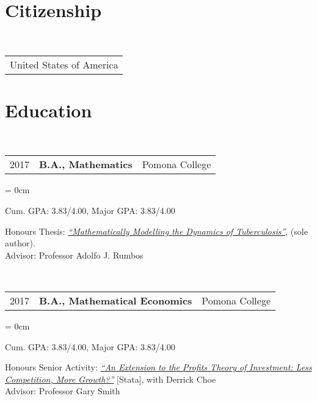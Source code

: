 \documentclass[a4paper, 11pt]{article}
\begin{document}
    \maketitle
    \thispagestyle{firststyle}

    \section{Citizenship}
      ~\begin{tabular}{l}
        United States of America\\
      \end{tabular}

    \section{Education}
      ~\begin{tabular}{lll}
        2017 & \textbf{B.A., Mathematics} & Pomona College\\
      \end{tabular}

    \begin{compactitem}\parskip = 0cm
      \item Cum. GPA: 3.83/4.00, Major GPA: 3.83/4.00\\
      \item Honours Thesis: \textit{\href{https://drive.google.com/file/d/0B1o_SCwTPL6TaEZuZ0ZBdXhlRms/view?usp=sharing}{``Mathematically Modelling the Dynamics of Tuberculosis''}}, (sole author).\\
      Advisor: Professor Adolfo J. Rumbos
    \end{compactitem}

    \vspace*{1em}

    ~\begin{tabular}{lll}
      2017 & \textbf{B.A., Mathematical Economics} & Pomona College\\
    \end{tabular}

    \begin{compactitem}\parskip = 0cm
      \item Cum. GPA: 3.83/4.00, Major GPA: 3.83/4.00\\
      \item Honours Senior Activity: \textit{\href{https://drive.google.com/file/d/0B1o_SCwTPL6TRzI3clFtbGdiVk0/view?usp=sharing}{``An Extension to the Profits Theory of Investment: Less Competition, More Growth?''}} {[Stata]}, with Derrick Choe\\
      Advisor: Professor Gary Smith
    \end{compactitem}
\end{document}
